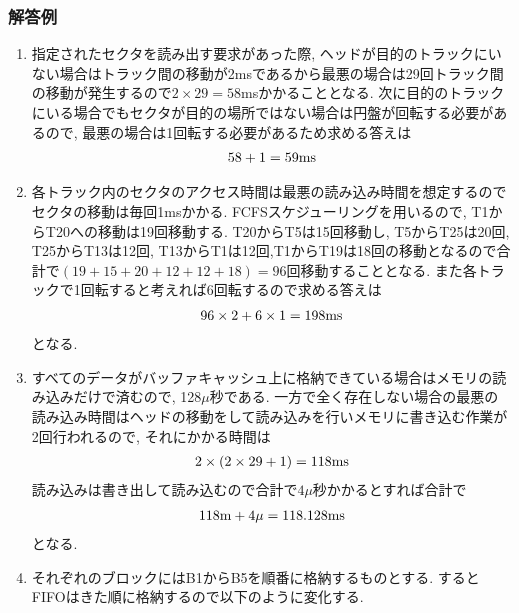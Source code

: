 \documentclass[dvipdfmx,titlepage, 11pt, a4paper]{jsarticle}%
\begin{document}
\subsubsection{解答例}
\begin{enumerate}[(1)]
  \setlength{\itemsep}{15pt}
\item 指定されたセクタを読み出す要求があった際, ヘッドが目的のトラックにいない場合はトラック間の移動が2msであるから最悪の場合は29回トラック間の移動が発生するので$2\times 29=58$msかかることとなる. 次に目的のトラックにいる場合でもセクタが目的の場所ではない場合は円盤が回転する必要があるので, 最悪の場合は1回転する必要があるため求める答えは
  \begin{eqnarray*}
    58+1=59{\rm ms}
  \end{eqnarray*}
\item 各トラック内のセクタのアクセス時間は最悪の読み込み時間を想定するのでセクタの移動は毎回1msかかる. FCFSスケジューリングを用いるので, T1からT20への移動は19回移動する. T20からT5は15回移動し, T5からT25は20回, T25からT13は12回, T13からT1は12回,T1からT19は18回の移動となるので合計で$(19+15+20+12+12+18)=96$回移動することとなる. また各トラックで1回転すると考えれば6回転するので求める答えは
  \begin{eqnarray*}
    96\times 2+6\times 1=198{\rm ms} 
  \end{eqnarray*}
  となる.
\item すべてのデータがバッファキャッシュ上に格納できている場合はメモリの読み込みだけで済むので, 128$\mu$秒である. 一方で全く存在しない場合の最悪の読み込み時間はヘッドの移動をして読み込みを行いメモリに書き込む作業が2回行われるので, それにかかる時間は
  \begin{eqnarray*}
    2\times(2\times 29+1)=118{\rm ms}
  \end{eqnarray*}
  読み込みは書き出して読み込むので合計で$4\mu$秒かかるとすれば合計で
  \begin{eqnarray*}
    118{\rm m}+4\mu=118.128{\rm ms}
  \end{eqnarray*}
  となる. 
\item それぞれのブロックにはB1からB5を順番に格納するものとする. するとFIFOはきた順に格納するので以下のように変化する.
  
\end{enumerate}
\end{document}
